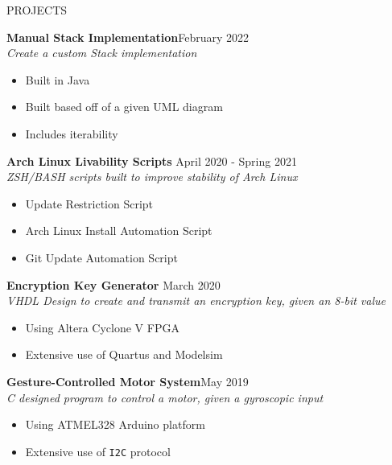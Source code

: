 \documentclass{resume} \usepackage{multirow}
\begin{document}
\begin{rSection}{PROJECTS}
	\vspace{-1.25em}
\item \textbf{Manual Stack Implementation}\hfill {February 2022} \\
	\emph{Create a custom Stack implementation}
	\begin{itemize}
         \itemsep -5pt {}
          \item Built in Java
	      \item Built based off of a given UML diagram
	      \item Includes iterability
	\end{itemize}
\item \textbf{Arch Linux Livability Scripts} \hfill {April 2020 - Spring 2021}\\
	\emph{ZSH/BASH scripts built to improve stability of Arch Linux}
	\begin{itemize}
	    \itemsep -5pt {}
	         \item Update Restriction Script
	         \item Arch Linux Install Automation Script
		 \item Git Update Automation Script
	\end{itemize}
\item \textbf{Encryption Key Generator} \hfill{March 2020}\\
	\emph{VHDL Design to create and transmit an encryption key, given an 8-bit value}
       \begin{itemize}
           \itemsep -5pt {}
	        \item Using Altera Cyclone V FPGA
		\item Extensive use of Quartus and Modelsim
	\end{itemize}
\item \textbf{Gesture-Controlled Motor System}\hfill {May 2019}\\
	\emph{C designed program to control a motor, given a gyroscopic input}
	\begin{itemize}
          \itemsep -5pt {}
	       \item Using ATMEL328 Arduino platform
	       \item Extensive use of \verb|I2C| protocol
	\end{itemize}
\end{rSection}
\end{document}
